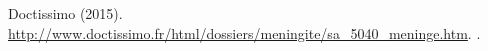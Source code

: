 \begin{thebibliography}{site5}

Doctissimo (2015).
\newblock
\url{http://www.doctissimo.fr/html/dossiers/meningite/sa_5040_meninge.htm}.
.

\end{thebibliography}